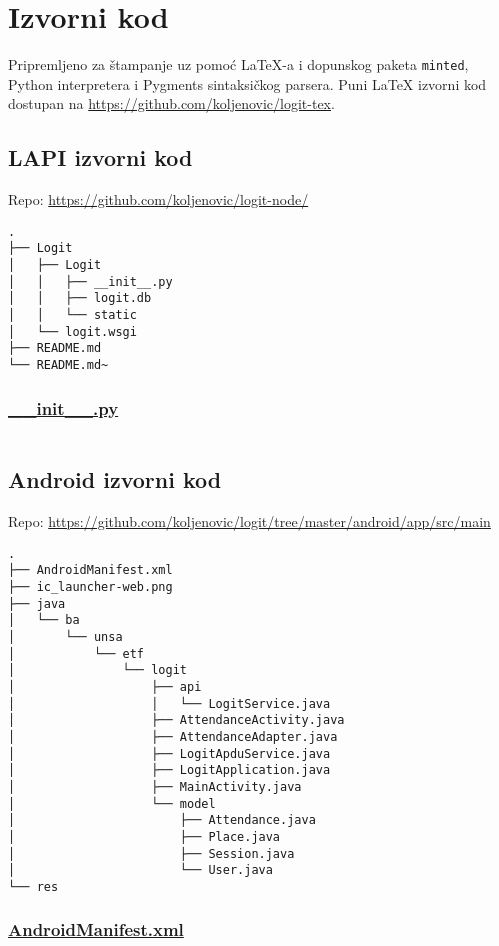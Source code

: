 \chapter{Izvorni kod}
Pripremljeno za štampanje uz pomoć \LaTeX{}-a i dopunskog paketa \texttt{minted}, Python interpretera i Pygments sintaksičkog parsera. Puni \LaTeX{} izvorni kod dostupan na \url{https://github.com/koljenovic/logit-tex}.
\section{LAPI izvorni kod}
{\small Repo: \url{https://github.com/koljenovic/logit-node/}}
\begin{verbatim}
.
├── Logit
│   ├── Logit
│   │   ├── __init__.py
│   │   ├── logit.db
│   │   └── static
│   └── logit.wsgi
├── README.md
└── README.md~
\end{verbatim}
\subsection{\small \url{__init__.py}}
\inputminted{python}{../logit-node/Logit/Logit/__init__.py}

\section{Android izvorni kod}
{\small Repo: \url{https://github.com/koljenovic/logit/tree/master/android/app/src/main}}
\begin{verbatim}
.
├── AndroidManifest.xml
├── ic_launcher-web.png
├── java
│   └── ba
│       └── unsa
│           └── etf
│               └── logit
│                   ├── api
│                   │   └── LogitService.java
│                   ├── AttendanceActivity.java
│                   ├── AttendanceAdapter.java
│                   ├── LogitApduService.java
│                   ├── LogitApplication.java
│                   ├── MainActivity.java
│                   └── model
│                       ├── Attendance.java
│                       ├── Place.java
│                       ├── Session.java
│                       └── User.java
└── res
\end{verbatim}

\pagebreak[4]
\subsection{\small \url{AndroidManifest.xml}}
\inputminted{xml}{../logit/android/app/src/main/AndroidManifest.xml}

